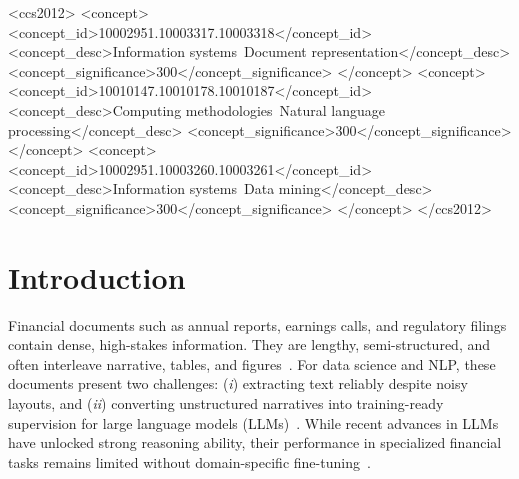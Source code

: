\documentclass[sigconf,authordraft,anonymous]{acmart}
\begin{document}
\begin{CCSXML}
<ccs2012>
 <concept>
  <concept_id>10002951.10003317.10003318</concept_id>
  <concept_desc>Information systems~Document representation</concept_desc>
  <concept_significance>300</concept_significance>
 </concept>
 <concept>
  <concept_id>10010147.10010178.10010187</concept_id>
  <concept_desc>Computing methodologies~Natural language processing</concept_desc>
  <concept_significance>300</concept_significance>
 </concept>
 <concept>
  <concept_id>10002951.10003260.10003261</concept_id>
  <concept_desc>Information systems~Data mining</concept_desc>
  <concept_significance>300</concept_significance>
 </concept>
</ccs2012>
\end{CCSXML}



\maketitle

\begingroup
\renewcommand\thefootnote{}
\addtocounter{footnote}{0}
\endgroup

\section{Introduction}
Financial documents such as annual reports, earnings calls, and regulatory filings contain dense, high-stakes information. They are lengthy, semi-structured, and often interleave narrative, tables, and figures~\cite{Meirkulov2024,FINRA2023}. For data science and NLP, these documents present two challenges: (\emph{i}) extracting text reliably despite noisy layouts, and (\emph{ii}) converting unstructured narratives into training-ready supervision for large language models (LLMs)~\cite{Feng2021}. While recent advances in LLMs have unlocked strong reasoning ability, their performance in specialized financial tasks remains limited without domain-specific fine-tuning~\cite{Jeong2024}.
\end{document}
